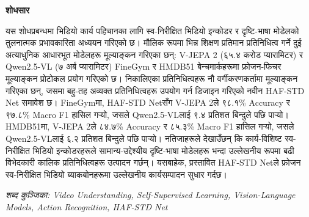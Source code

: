 \documentclass[a4paper, 12pt]{article}
\newcommand{\nep}[1]{{\devanagarifont #1}}
\begin{document}
\begin{center}
{\fontsize{18}{22}\selectfont \textbf{\nep{शोधसार}}}
\end{center}

\vspace{0.5cm}

\noindent
\fontsize{12}{18}\selectfont
\nep{यस शोधप्रबन्धमा भिडियो कार्य पहिचानका लागि स्व-निरीक्षित भिडियो इन्कोडर र दृष्टि-भाषा मोडेलको तुलनात्मक प्रभावकारिता अध्ययन गरिएको छ। मौलिक रूपमा भिन्न शिक्षण प्रतिमान प्रतिनिधित्व गर्ने दुई अत्याधुनिक आधारभूत मोडेलहरू मूल्याङ्कन गरिएका छन्: }V-JEPA 2 (\nep{६५.४ करोड प्यारामिटर}) \nep{र }Qwen2.5-VL (\nep{७ अर्ब प्यारामिटर}) FineGym \nep{र }HMDB51 \nep{बेन्चमार्कहरूमा फ्रोजन-फिचर मूल्याङ्कन प्रोटोकल प्रयोग गरिएको छ। निकालिएका प्रतिनिधित्वहरू नौ वर्गीकरणकर्तामा मूल्याङ्कन गरिएका छन्, जसमा बहु-तह अव्यक्त प्रतिनिधित्वहरू उपयोग गर्न डिजाइन गरिएको नवीन }HAF-STD Net\nep{ समावेश छ। }FineGym\nep{मा, }HAF-STD Net\nep{सँग }V-JEPA 2\nep{ले ९८.१\%} Accuracy \nep{र ९७.८\% }Macro F1 \nep{हासिल गर्‍यो, जसले }Qwen2.5-VL\nep{लाई ९.४ प्रतिशत बिन्दुले पछि पार्‍यो। }HMDB51\nep{मा, }V-JEPA 2\nep{ले ८४.७\%} Accuracy \nep{र ८५.३\% }Macro F1 \nep{हासिल गर्‍यो, जसले }Qwen2.5-VL\nep{लाई ६.२ प्रतिशत बिन्दुले पछि पार्‍यो। नतिजाहरूले देखाउँछन् कि कार्य-विशिष्ट स्व-निरीक्षित भिडियो इन्कोडरहरूले सामान्य-उद्देश्यीय दृष्टि-भाषा मोडेलहरू भन्दा उल्लेखनीय रूपमा बढी विभेदकारी कालिक प्रतिनिधित्वहरू उत्पादन गर्छन्। यसबाहेक, प्रस्तावित }HAF-STD Net\nep{ले फ्रोजन स्व-निरीक्षित भिडियो ब्याकबोनहरूमा उल्लेखनीय कार्यसम्पादन सुधार गर्दछ।}

\vspace{0.8cm}

\noindent
{\fontsize{10}{14}\selectfont \textit{\nep{शब्द कुञ्जिका:} Video Understanding, Self-Supervised Learning, Vision-Language Models, Action Recognition, HAF-STD Net}}
\end{document}

